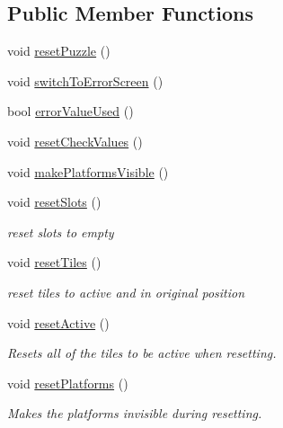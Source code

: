 \subsection*{Public Member Functions}
\begin{DoxyCompactItemize}
\item 
void \hyperlink{class_array_access_completion_a317a8a4cc02701f79003290ba3b00f02}{reset\+Puzzle} ()
\item 
void \hyperlink{class_array_access_completion_a46a4adc2ab93ea43fb9acb31a3770624}{switch\+To\+Error\+Screen} ()
\item 
bool \hyperlink{class_array_access_completion_a16f52bce4f85c9dc5e6f751531988bb0}{error\+Value\+Used} ()
\item 
void \hyperlink{class_array_access_completion_ac2350f79701c5e7a953e44e788347c6c}{reset\+Check\+Values} ()
\item 
void \hyperlink{class_array_access_completion_ac3834cd64df95140d0becf11f7eb15de}{make\+Platforms\+Visible} ()
\item 
void \hyperlink{class_array_access_completion_a7d73c45ea206180019c5cc0e7a73eb92}{reset\+Slots} ()
\begin{DoxyCompactList}\small\item\em reset slots to empty \end{DoxyCompactList}\item 
void \hyperlink{class_array_access_completion_a0975baec709eab99fa831cefd45a2069}{reset\+Tiles} ()
\begin{DoxyCompactList}\small\item\em reset tiles to active and in original position \end{DoxyCompactList}\item 
void \hyperlink{class_array_access_completion_ac8b88581ac5e6fe71128b6a4c5c64c12}{reset\+Active} ()
\begin{DoxyCompactList}\small\item\em Resets all of the tiles to be active when resetting. \end{DoxyCompactList}\item 
void \hyperlink{class_array_access_completion_af92ecc71a759308e06bf8b4d96ca3c78}{reset\+Platforms} ()
\begin{DoxyCompactList}\small\item\em Makes the platforms invisible during resetting. \end{DoxyCompactList}\end{DoxyCompactItemize}
